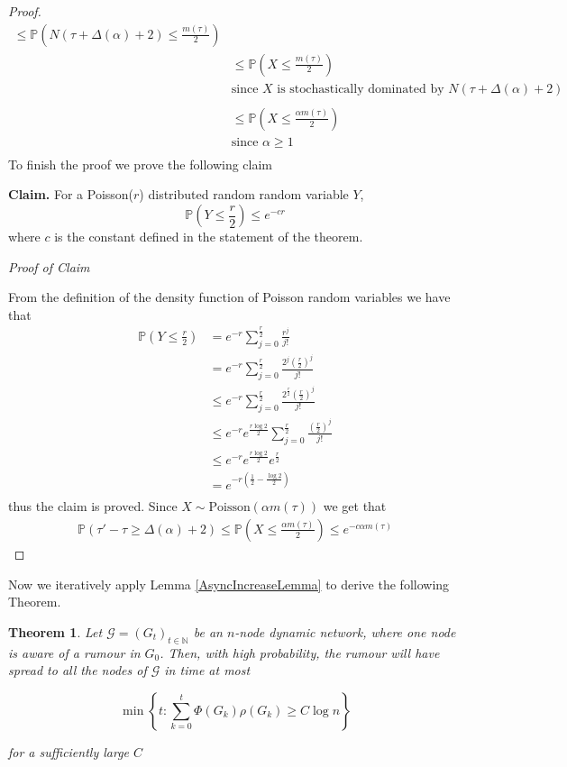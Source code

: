 \documentclass[a4paper,11pt]{article}
\newtheorem{theorem}{Theorem}[section]
\theoremstyle{definition}
\newcommand{\ModelIntro}{
	Let $\mathcal{G} = (G_t)_{t \in \mathbb{N}}$ be an $n$-node dynamic network, where one node is aware of a rumour in $G_0$.
}
\begin{document}
\begin{proof}
\begin{align*}
		\leq \mathbb{P} (N(\tau + \Delta(\alpha) + 2) \leq \frac{m(\tau)}{2}) \\ %
		& \leq \mathbb{P}(X \leq \frac{m(\tau)}{2}) \\
		& \text{since } X \text{ is stochastically dominated by } N(\tau + \Delta(\alpha) + 2) \\
		& \\
		& \leq \mathbb{P}(X \leq \frac{\alpha m(\tau)}{2}) \\
		& \text{since } \alpha \geq 1 \\ %
	\end{align*}
	To finish the proof we prove the following claim

	\noindent
	\textbf{Claim.} For a Poisson($r$) distributed random random variable $Y$, 
	$$
		\mathbb{P}(Y \leq \frac{r}{2}) \leq e^{-cr}
	$$
	where $c$ is the constant defined in the statement of the theorem.

	\noindent
	\textit{Proof of Claim}

	\noindent
	From the definition of the density function of Poisson random variables we have that 
	\begin{align*}
		\mathbb{P}(Y \leq \frac{r}{2}) & = e^{-r} \sum_{j=0}^\frac{r}{2} \frac{r^j}{j!} \\ %
		& = e^{-r} \sum_{j=0}^\frac{r}{2} \frac{2^j(\frac{r}{2})^j}{j!} \\
		& \leq e^{-r} \sum_{j=0}^\frac{r}{2} \frac{2^\frac{r}{2}(\frac{r}{2})^j}{j!} \\
		& \leq e^{-r} e^\frac{r \log 2}{2} \sum_{j=0}^\frac{r}{2} \frac{(\frac{r}{2})^j}{j!} \\
		& \leq e^{-r} e^\frac{r \log 2}{2} e^\frac{r}{2} \\
		& = e^{-r(\frac{1}{2} - \frac{\log2}{2})} \\ %
	\end{align*}
	thus the claim is proved. Since $X \sim \text{Poisson}(\alpha m(\tau))$ we get that
	\begin{align*}
		\mathbb{P}(\tau' - \tau \geq \Delta(\alpha) + 2) \leq \mathbb{P}(X \leq \frac{\alpha m(\tau)}{2}) \leq e^{-c \alpha m(\tau)}
	\end{align*}	
\end{proof}

Now we iteratively apply Lemma \ref{AsyncIncreaseLemma} to derive the following Theorem.

\begin{theorem}
	\ModelIntro Then, with high probability, the rumour will have spread to all the nodes of $\mathcal{G}$ in time at most

	$$
		\min \left\{t : \sum_{k=0}^t \Phi(G_k)\rho(G_k) \geq C \log n \right\} 
	$$

	\noindent
	for a sufficiently large $C$
\end{theorem}
\end{document}
